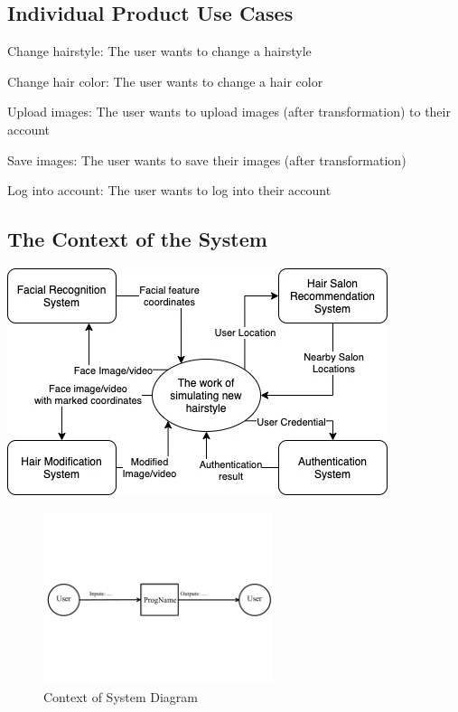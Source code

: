 \documentclass[12pt]{article}
\begin{document}
\subsection{Individual Product Use Cases}
\begin{UC}
    \item Change hairstyle: The user wants to change a hairstyle
    \item Change hair color: The user wants to change a hair color
    \item Upload images: The user wants to upload images (after transformation) to their account
    \item Save images: The user wants to save their images (after transformation)
    \item Log into account: The user wants to log into their account
\end{UC}

\subsection{The Context of the System}
\graphicspath{ {./system_context_diagram.jpg/} }
\includegraphics[width=\textwidth]{system_context_diagram}
\begin{figure}[h!]
\begin{center}
 \includegraphics[width=0.6\textwidth]{SystemContextFigure}
\caption{Context of System Diagram}
\end{center}
\end{figure}
\end{document}
